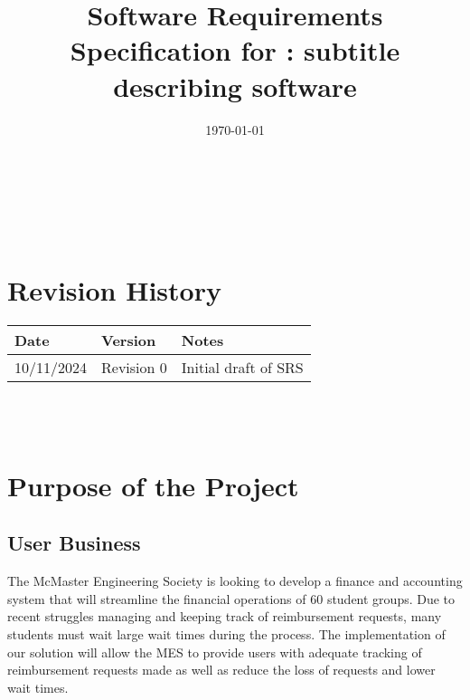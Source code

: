 \documentclass[12pt]{article}
\begin{document}
\title{Software Requirements Specification for \progname: subtitle describing software} 
\author{\authname}
\date{\today}
	
\maketitle

~\newpage


\tableofcontents

~\newpage

\section*{Revision History}

\begin{tabularx}{\textwidth}{p{3cm}p{2cm}X}
\toprule {\textbf{Date}} & {\textbf{Version}} & {\textbf{Notes}}\\
\midrule
10/11/2024 & Revision 0 & Initial draft of SRS\\
\bottomrule
\end{tabularx}

~\\

~\newpage
\section{Purpose of the Project}
\subsection{User Business}
The McMaster Engineering Society is looking to develop a finance and accounting system that will streamline the financial operations of 60 student groups. Due to recent struggles managing and keeping track of reimbursement requests, many students must wait large wait times during the process. The implementation of our solution will allow the MES to provide users with adequate tracking of reimbursement requests made as well as reduce the loss of requests and lower wait times.
\end{document}
